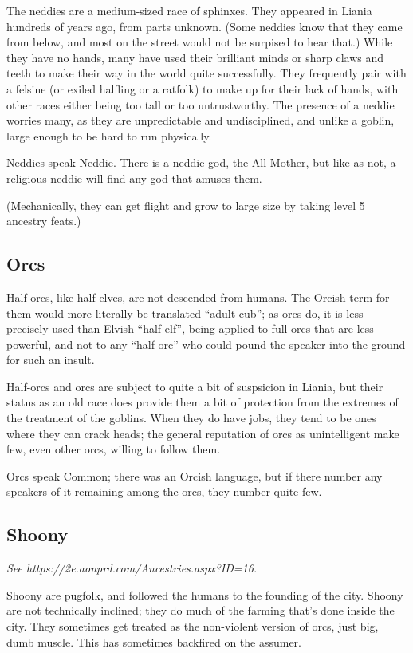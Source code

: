 \documentclass{report}
\begin{document}
The neddies are a medium-sized race of sphinxes. They appeared in Liania hundreds
of years ago, from parts unknown. (Some neddies know that they came from below,
and most on the street would not be surpised to hear that.) While they have no
hands, many have used their brilliant minds or sharp claws and teeth to make their
way in the world quite successfully. They frequently pair with a felsine (or
exiled halfling or a ratfolk) to make up for their lack of hands, with other
races either being too tall or too untrustworthy. The presence of a neddie
worries many, as they are unpredictable and undisciplined, and unlike a goblin,
large enough to be hard to run physically.

Neddies speak Neddie. There is a neddie god, the All-Mother, but like as not, a
religious neddie will find any god that amuses them.

(Mechanically, they can get flight and grow to large size by taking level 5 ancestry
feats.)

\subsection{Orcs}

Half-orcs, like half-elves, are not descended from humans. The Orcish term for
them would more literally be translated ``adult cub''; as orcs do, it is less
precisely used than Elvish ``half-elf'', being applied to full orcs that are less powerful, and not to
any ``half-orc'' who could pound the speaker into the ground for such an insult.

Half-orcs and orcs are subject to quite a bit of suspsicion in Liania, but their
status as an old race does provide them a bit of protection from the extremes
of the treatment of the goblins. When they do have jobs, they tend to be ones
where they can crack heads; the general reputation of orcs as unintelligent
make few, even other orcs, willing to follow them.

Orcs speak Common; there was an Orcish language, but if there number any speakers
of it remaining among the orcs, they number quite few.

\subsection{Shoony}

\emph{See https://2e.aonprd.com/Ancestries.aspx?ID=16.}

Shoony are pugfolk, and followed the humans to the founding of the city. Shoony
are not technically inclined; they do much of the farming that's done inside the
city. They sometimes get treated as the non-violent version of orcs, just big,
dumb muscle. This has sometimes backfired on the assumer.
\end{document}
